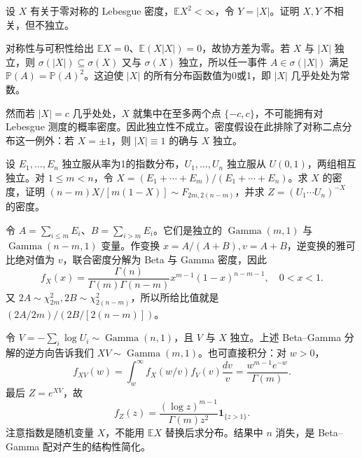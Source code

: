 \documentclass[UTF8,12pt,a4paper,fontset=fandol]{ctexbook}
\newcommand{\E}{\mathbb E}
\newcommand{\PP}{\mathbb P}
\begin{document}
\begin{example}[原题5：不相关但不独立]\label{yau:2012-5}
设 $X$ 有关于零对称的 Lebesgue 密度，$\E X^2<\infty$，令 $Y=|X|$。证明 $X,Y$ 不相关，但不独立。
\end{example}
\begin{solve}
对称性与可积性给出 $\E X=0$、$\E(X|X|)=0$，故协方差为零。若 $X$ 与 $|X|$ 独立，则 $\sigma(|X|)\subseteq\sigma(X)$ 又与 $\sigma(X)$ 独立，所以任一事件 $A\in\sigma(|X|)$ 满足 $\PP(A)=\PP(A)^2$。这迫使 $|X|$ 的所有分布函数值为0或1，即 $|X|$ 几乎处处为常数。

然而若 $|X|=c$ 几乎处处，$X$ 就集中在至多两个点 $\{-c,c\}$，不可能拥有对 Lebesgue 测度的概率密度。因此独立性不成立。密度假设在此排除了对称二点分布这一例外：若 $X=\pm1$，则 $|X|\equiv1$ 的确与 $X$ 独立。
\end{solve}

\begin{example}[原题6：指数比例与随机幂]\label{yau:2012-6}
设 $E_1,\ldots,E_n$ 独立服从率为1的指数分布，$U_1,\ldots,U_n$ 独立服从 $U(0,1)$，两组相互独立。对 $1\le m<n$，令 $X=(E_1+\cdots+E_m)/(E_1+\cdots+E_n)$。求 $X$ 的密度，证明 $(n-m)X/[m(1-X)]\sim F_{2m,2(n-m)}$，并求 $Z=(U_1\cdots U_n)^{-X}$ 的密度。
\end{example}
\begin{solve}
令 $A=\sum_{i\le m}E_i$、$B=\sum_{i>m}E_i$。它们是独立的 $\operatorname{Gamma}(m,1)$ 与 $\operatorname{Gamma}(n-m,1)$ 变量。作变换 $x=A/(A+B),v=A+B$，逆变换的雅可比绝对值为 $v$，联合密度分解为 Beta 与 Gamma 密度，因此
\[
f_X(x)=\frac{\Gamma(n)}{\Gamma(m)\Gamma(n-m)}x^{m-1}(1-x)^{n-m-1},\quad0<x<1.
\]
又 $2A\sim\chi^2_{2m},2B\sim\chi^2_{2(n-m)}$，所以所给比值就是 $(2A/2m)/(2B/[2(n-m)])$。

令 $V=-\sum_i\log U_i\sim\operatorname{Gamma}(n,1)$，且 $V$ 与 $X$ 独立。上述 Beta--Gamma 分解的逆方向告诉我们 $XV\sim\operatorname{Gamma}(m,1)$。也可直接积分：对 $w>0$，
\[
f_{XV}(w)=\int_w^\infty f_X(w/v)f_V(v)\frac{dv}{v}=\frac{w^{m-1}e^{-w}}{\Gamma(m)}.
\]
最后 $Z=e^{XV}$，故
\[
f_Z(z)=\frac{(\log z)^{m-1}}{\Gamma(m)z^2}\mathbf1_{\{z>1\}}.
\]
注意指数是随机变量 $X$，不能用 $\E X$ 替换后求分布。结果中 $n$ 消失，是 Beta--Gamma 配对产生的结构性简化。
\end{solve}
\end{document}
